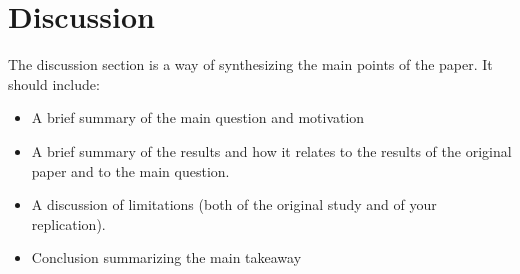 \documentclass[11pt]{article}
\begin{document}
\section{Discussion}
The discussion section is a way of synthesizing the main points of the paper. It should include:
\begin{itemize}
    \item A brief summary of the main question and motivation
    \item A brief summary of the results and how it relates to the results of the original paper and to the main question.
    \item A discussion of limitations (both of the original study and of your replication).
    \item Conclusion summarizing the main takeaway
\end{itemize}





\end{document}

